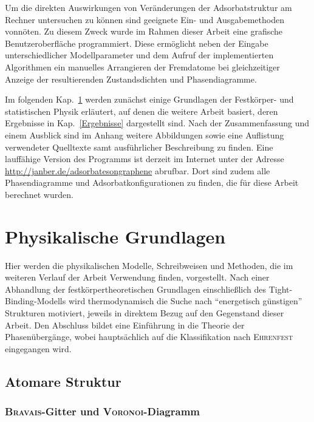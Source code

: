 \documentclass[a4paper, 10pt, twoside, openany]{book} %
\begin{document}
Um die direkten Auswirkungen von Veränderungen der Adsorbatstruktur am Rechner untersuchen zu können sind geeignete Ein- und Ausgabemethoden vonnöten. Zu diesem Zweck wurde im Rahmen dieser Arbeit eine grafische Benutzeroberfläche programmiert. Diese ermöglicht neben der Eingabe unterschiedlicher Modellparameter und dem Aufruf der implementierten Algorithmen ein manuelles Arrangieren der Fremdatome bei gleichzeitiger Anzeige der resultierenden Zustandsdichten und Phasendiagramme.

Im folgenden Kap.~\ref{Theorie} werden zunächst einige Grundlagen der Festkörper- und statistischen Physik erläutert, auf denen die weitere Arbeit basiert, deren Ergebnisse in Kap.~\ref{Ergebnisse} dargestellt sind. Nach der Zusammenfassung und einem Ausblick sind im Anhang weitere Abbildungen sowie eine Auflistung verwendeter Quelltexte samt ausführlicher Beschreibung zu finden. Eine lauffähige Version des Programms ist derzeit im Internet unter der Adresse \url{http://janber.de/adsorbatesongraphene} abrufbar. Dort sind zudem alle Phasendiagramme und Adsorbatkonfigurationen zu finden, die für diese Arbeit berechnet wurden.

\chapter{Physikalische Grundlagen}
\label{Theorie}

Hier werden die physikalischen Modelle, Schreibweisen und Methoden, die im weiteren Verlauf der Arbeit Verwendung finden, vorgestellt. Nach einer Abhandlung der festkörpertheoretischen Grundlagen einschließlich des Tight-Binding-Modells wird thermodynamisch die Suche nach "`energetisch günstigen"' Strukturen motiviert, jeweils in direktem Bezug auf den Gegenstand dieser Arbeit. Den Abschluss bildet eine Einführung in die Theorie der Phasenübergänge, wobei hauptsächlich auf die Klassifikation nach \textsc{Ehrenfest} eingegangen wird.

\section{Atomare Struktur}
\label{Atomare Struktur}

\subsection{\textsc{Bravais}-Gitter und \textsc{Voronoi}-Diagramm}
\label{Bravais-Gitter}
\end{document}
